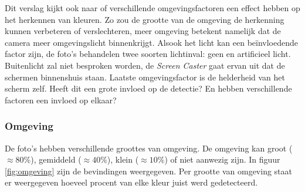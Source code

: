 Dit verslag kijkt ook naar of verschillende omgevingsfactoren een effect hebben op het herkennen van kleuren. Zo zou de grootte van de omgeving de herkenning kunnen verbeteren of verslechteren, meer omgeving betekent namelijk dat de camera meer omgevingslicht binnenkrijgt. Alsook het licht kan een beïnvloedende factor zijn, de foto's behandelen twee soorten lichtinval: geen en artificieel licht. Buitenlicht zal niet besproken worden, de {\it Screen Caster} gaat ervan uit dat de schermen binnenshuis staan. Laatste omgevingsfactor is de helderheid van het scherm zelf. Heeft dit een grote invloed op de detectie? En hebben verschillende factoren een invloed op elkaar?

\subsubsection{Omgeving}
De foto's hebben verschillende groottes van omgeving. De omgeving kan groot ($\approx 80\%$), gemiddeld ($\approx 40\%$), klein ($\approx 10\%$) of niet aanwezig zijn. In figuur \ref{fig:omgeving} zijn de bevindingen weergegeven. Per grootte van omgeving staat er weergegeven hoeveel procent van elke kleur juist werd gedetecteerd.

